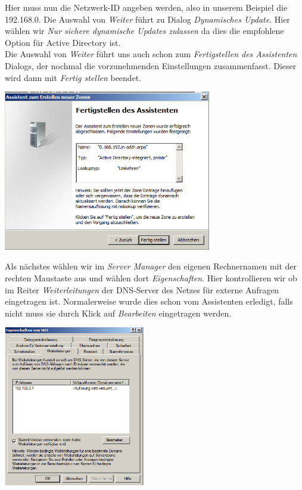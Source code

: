 \documentclass[12pt,a4paper,titlepage]{scrartcl} %
\begin{document}
Hier muss nun die Netzwerk-ID angeben werden, also in unserem Beispiel die 192.168.0. Die Auswahl von \emph{Weiter} führt zu Dialog \emph{Dynamisches Update}. Hier wählen wir \emph{Nur sichere dynamische Updates zulassen} da dies die empfohlene Option für Active Directory ist.\\
Die Auswahl von \emph{Weiter} führt uns auch schon zum \emph{Fertigstellen des Assistenten} Dialogs, der nochmal die vorzunehmenden Einstellungen zusammenfasst. Dieser wird dann mit \emph{Fertig stellen} beendet.\\

	\begin{center}\includegraphics[height=7cm]{Bilder/036(DNS08)}\\ \end{center}

Als nächstes wählen wir im \emph{Server Manager} den eigenen Rechnernamen mit der rechten Maustaste aus und wählen dort \emph{Eigenschaften}. Hier kontrollieren wir ob im Reiter \emph{Weiterleitungen} der DNS-Server des Netzes für externe Anfragen eingetragen ist. Normalerweise wurde dies schon vom Assistenten erledigt, falls nicht muss sie durch Klick auf \emph{Bearbeiten} eingetragen werden.\\

	\begin{center}\includegraphics[height=7cm]{Bilder/038(DNS10)}\\ \end{center}
\end{document}
